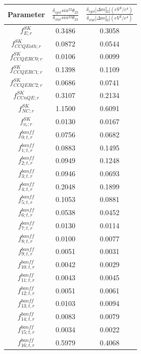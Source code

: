 \clearpage

\begin{table}
\centering
\begin{tabular}{| c | c | c |}
\hline
 Parameter               &  $\frac{\delta_{syst} sin^22\theta_{23}}{\delta_{stat} sin^22\theta_{23}}$   &  $\frac{\delta_{syst}|\Delta m^2_{32}| (eV^{2}/c^{4})}{\delta_{stat} |\Delta m^2_{32}| (eV^{2}/c^{4})}$ \\
\hline

{\color{red}$f_{E; r}^{SK}$  }	 & 0.3486	 & 0.3058 \\
$f_{CCQEoth; r}^{SK}$	 & 0.0872	 & 0.0544 \\
$f_{CCQERC0; r}^{SK}$	 & 0.0106	 & 0.0099 \\
$f_{CCQERC1; r}^{SK}$	 & 0.1398	 & 0.1109 \\
$f_{CCQERC2; r}^{SK}$	 & 0.0686	 & 0.0741 \\
{\color{red}$f_{CCnQE; r}^{SK}$}	 & 0.3107	 & 0.2134 \\
{\color{red}$f_{NC; r}^{SK}$}	 & 1.1500	 & 0.6091 \\
$f_{\nu_e; r}^{SK}$	 & 0.0130	 & 0.0167 \\
$f_{0; t, r}^{banff}$	 & 0.0756	 & 0.0682 \\
$f_{1; t, r}^{banff}$	 & 0.0883	 & 0.1495 \\
$f_{2; t, r}^{banff}$	 & 0.0949	 & 0.1248 \\
$f_{3; t, r}^{banff}$	 & 0.0946	 & 0.0693 \\
$f_{4; t, r}^{banff}$	 & 0.2048	 & 0.1899 \\
$f_{5; t, r}^{banff}$	 & 0.1053	 & 0.0881 \\
$f_{6; t, r}^{banff}$	 & 0.0538	 & 0.0452 \\
$f_{7; t, r}^{banff}$	 & 0.0130	 & 0.0114 \\
$f_{8; t, r}^{banff}$	 & 0.0100	 & 0.0077 \\
$f_{9; t, r}^{banff}$	 & 0.0051	 & 0.0031 \\
$f_{10; t, r}^{banff}$	 & 0.0042	 & 0.0029 \\
$f_{11; t, r}^{banff}$	 & 0.0043	 & 0.0045 \\
$f_{12; t, r}^{banff}$	 & 0.0051	 & 0.0061 \\
$f_{13; t, r}^{banff}$	 & 0.0103	 & 0.0094 \\
$f_{14; t, r}^{banff}$	 & 0.0083	 & 0.0079 \\
$f_{15; t, r}^{banff}$	 & 0.0034	 & 0.0022 \\
{\color{red}$f_{16; t, r}^{banff}$}	 & 0.5979	 & 0.4068 \\

\end{tabular}
\end{table}
